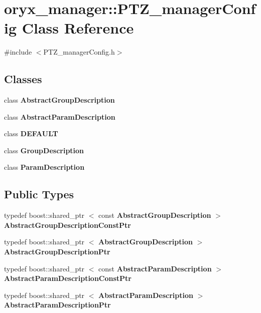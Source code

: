 \section{oryx\-\_\-manager\-:\-:\-P\-T\-Z\-\_\-manager\-Config \-Class \-Reference}
\label{classoryx__manager_1_1PTZ__managerConfig}


{\ttfamily \#include $<$\-P\-T\-Z\-\_\-manager\-Config.\-h$>$}

\subsection*{\-Classes}
\begin{DoxyCompactItemize}
\item 
class {\bf \-Abstract\-Group\-Description}
\item 
class {\bf \-Abstract\-Param\-Description}
\item 
class {\bf \-D\-E\-F\-A\-U\-L\-T}
\item 
class {\bf \-Group\-Description}
\item 
class {\bf \-Param\-Description}
\end{DoxyCompactItemize}
\subsection*{\-Public \-Types}
\begin{DoxyCompactItemize}
\item 
typedef boost\-::shared\-\_\-ptr\*
$<$ const \*
{\bf \-Abstract\-Group\-Description} $>$ {\bf \-Abstract\-Group\-Description\-Const\-Ptr}
\item 
typedef boost\-::shared\-\_\-ptr\*
$<$ {\bf \-Abstract\-Group\-Description} $>$ {\bf \-Abstract\-Group\-Description\-Ptr}
\item 
typedef boost\-::shared\-\_\-ptr\*
$<$ const \*
{\bf \-Abstract\-Param\-Description} $>$ {\bf \-Abstract\-Param\-Description\-Const\-Ptr}
\item 
typedef boost\-::shared\-\_\-ptr\*
$<$ {\bf \-Abstract\-Param\-Description} $>$ {\bf \-Abstract\-Param\-Description\-Ptr}
\end{DoxyCompactItemize}
